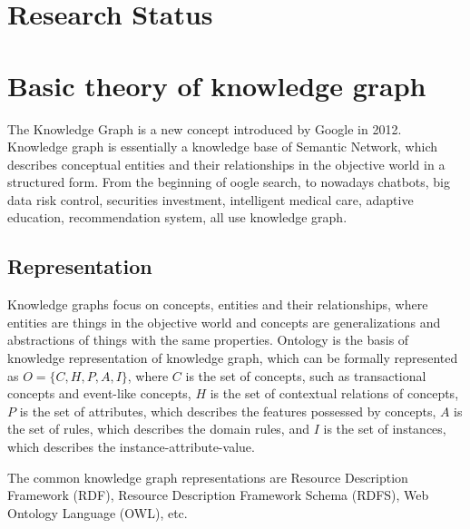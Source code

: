 \section{Research Status}


\section{Basic theory of knowledge graph}
The Knowledge Graph is a new concept introduced by Google in 2012. Knowledge graph is essentially a knowledge base of Semantic Network, which describes conceptual entities and their relationships in the objective world in a structured form. From the beginning of oogle search, to nowadays chatbots, big data risk control, securities investment, intelligent medical care, adaptive education, recommendation system, all use knowledge graph.

\subsection{Representation}
Knowledge graphs focus on concepts, entities and their relationships, where entities are things in the objective world and concepts are generalizations and abstractions of things with the same properties. Ontology is the basis of knowledge representation of knowledge graph, which can be formally represented as $O=\{C,H,P,A,I\}$, where $C$ is the set of concepts, such as transactional concepts and event-like concepts, $H$ is the set of contextual relations of concepts, $P$ is the set of attributes, which describes the features possessed by concepts, $A$ is the set of rules, which describes the domain rules, and $I$ is the set of instances, which describes the instance-attribute-value.

The common knowledge graph representations are Resource Description Framework (RDF), Resource Description Framework Schema (RDFS), Web Ontology Language (OWL), etc.

